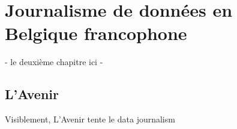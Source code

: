 
\chapter{Journalisme de données en Belgique francophone}

- le deuxième chapitre ici -

\section{L'Avenir}

Visiblement, L'Avenir tente le data journalism
